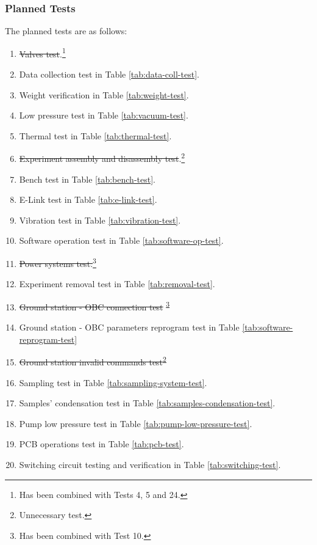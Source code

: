 \documentclass[a4paper,12pt,twoside]{article}
\begin{document}
\raggedbottom

\subsubsection{Planned Tests}
The planned tests are as follows:

\begin{enumerate}
    \item \st{Valves test}.\footnote{Has been combined with Tests 4, 5 and 24.\label{fn:test-combined}}
    \item Data collection test in Table \ref{tab:data-coll-test}.
    \item Weight verification in Table \ref{tab:weight-test}.
    \item Low pressure test in Table \ref{tab:vacuum-test}.
    \item Thermal test in Table \ref{tab:thermal-test}.
    \item \st{Experiment assembly and disassembly test}.\footnote{Unnecessary test.\label{fn:test-removed}}
    \item Bench test in Table \ref{tab:bench-test}.
    \item E-Link test in Table \ref{tab:e-link-test}.
    \item Vibration test in Table \ref{tab:vibration-test}.
    \item Software operation test in Table \ref{tab:software-op-test}.
    \item \st{Power systems test.}\footnote{Has been combined with Test 10.\label{fn:test-combined10}}
    \item Experiment removal test in Table \ref{tab:removal-test}.
    \item \st{Ground station - OBC connection test} \textsuperscript{\ref{fn:test-combined10}}
    \item Ground station - OBC parameters reprogram test in Table \ref{tab:software-reprogram-test}
    \item \st{Ground station invalid commands test}\textsuperscript{\ref{fn:test-removed}}
    \item Sampling test in Table \ref{tab:sampling-system-test}.
    \item Samples' condensation test in Table \ref{tab:samples-condensation-test}.
    \item Pump low pressure test in Table \ref{tab:pump-low-pressure-test}.
    \item PCB operations test in Table \ref{tab:pcb-test}.
    \item Switching circuit testing and verification in Table \ref{tab:switching-test}.

\end{enumerate}
\end{document}
